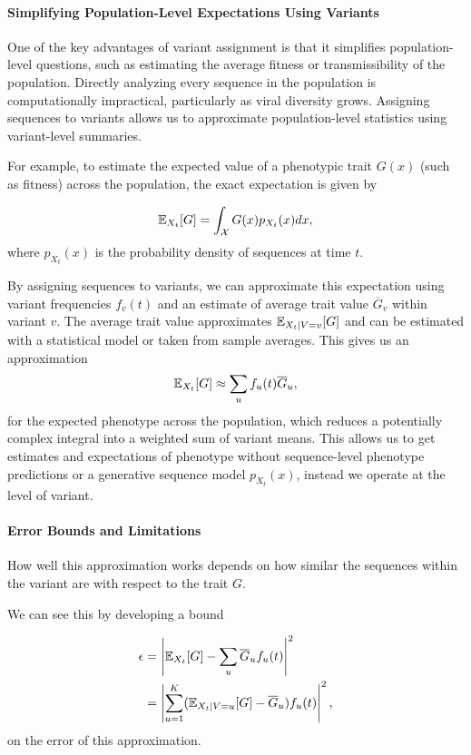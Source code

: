 \paragraph{Simplifying Population-Level Expectations Using Variants}

One of the key advantages of variant assignment is that it simplifies population-level questions, such as estimating the average fitness or transmissibility of the population. 
Directly analyzing every sequence in the population is computationally impractical, particularly as viral diversity grows. Assigning sequences to variants allows us to approximate population-level statistics using variant-level summaries.

For example, to estimate the expected value of a phenotypic trait $G(x)$ (such as fitness) across the population, the exact expectation is given by

\begin{equation}
  \mathbb{E}_{X_t}[G] = \int_{\mathcal{X}} G(x) p_{X_{t}}(x) dx,
\end{equation}
where $p_{X_t}(x)$ is the probability density of sequences at time $t$.

By assigning sequences to variants, we can approximate this expectation using variant frequencies $f_{v}(t)$ and an estimate of average trait value $\overline{G}_{v}$ within variant $v$.
The average trait value approximates $\mathbb{E}_{X_t \mid V=v}[G]$ and can be estimated with a statistical model or taken from sample averages.
This gives us an approximation
\begin{equation}
  \mathbb{E}_{X_t}[G] \approx \sum_{u} f_{u}(t) \overline{G}_u,
\end{equation}
for the expected phenotype across the population, which reduces a potentially complex integral into a weighted sum of variant means.
This allows us to get estimates and expectations of phenotype without sequence-level phenotype predictions or a generative sequence model $p_{X_t}(x)$, instead we operate at the level of variant.

\paragraph{Error Bounds and Limitations}

How well this approximation works depends on how similar the sequences within the variant are with respect to the trait $G$. 

We can see this by developing a bound 

\begin{align}
  \epsilon &= \left| \mathbb{E}_{X_t}[G]  - \sum_{u} \overline{G}_u f_{u}(t) \right|^2\\ 
           &= \left| \sum_{u=1}^{K} (\mathbb{E}_{X_{t} \mid V=u}[G] - \overline{G}_u) f_u(t) \right|^2,
\end{align}
on the error of this approximation.

